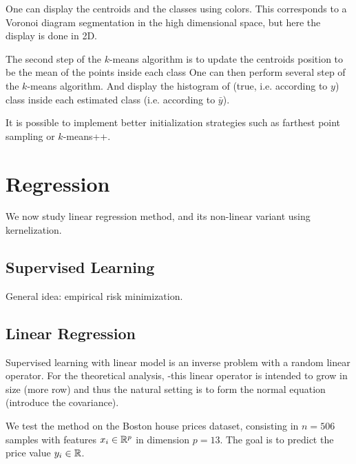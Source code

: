 One can display the centroids and the classes using colors.
This corresponds to a Voronoi diagram segmentation in the high
dimensional space, but here the display is done in 2D.

The second step of the $k$-means algorithm is to update the centroids
position to be the mean of the points inside each class
One can then perform several step of the $k$-means algorithm. 
And display the histogram of (true, i.e. according to $y$) class  inside
each estimated class (i.e. according to $\bar y$).




It is possible to implement better initialization strategies such as farthest point sampling or $k$-means++.





\section{Regression}

We now study linear regression method, and its non-linear variant using kernelization.


\subsection{Supervised Learning}

General idea: empirical risk minimization. 


\subsection{Linear Regression}


Supervised learning with linear model is an inverse problem with a random linear operator. For the theoretical analysis, -this linear operator is intended to grow in size (more row) and thus the natural setting is to form the normal equation (introduce the covariance).

We test the method on the Boston house prices dataset, consisting in $n=506$ samples with
features $x_i \in \mathbb{R}^p$ in dimension $p=13$. The goal is to predict the price value
$y_i \in \mathbb{R}$. 

